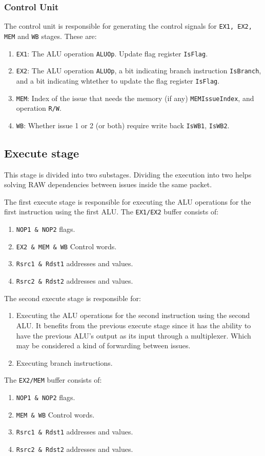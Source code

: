 \documentclass[12pt]{article}
\begin{document}
\subsubsection{Control Unit}
The control unit is responsible for generating the control signals for \texttt{EX1, EX2, MEM} and \texttt{WB} stages. These are:
\begin{enumerate}
\item \texttt{EX1}: The ALU operation \texttt{ALUOp}. Update flag register \texttt{IsFlag}.
\item \texttt{EX2}: The ALU operation \texttt{ALUOp}, a bit indicating branch instruction \texttt{IsBranch}, and a bit indicating whtether to update the flag register \texttt{IsFlag}.
\item \texttt{MEM}: Index of the issue that needs the memory (if any) \texttt{MEMIssueIndex}, and operation \texttt{R/W}.
\item \texttt{WB}: Whether issue 1 or 2 (or both) require write back \texttt{IsWB1}, \texttt{IsWB2}.
\end{enumerate}

\subsection{Execute stage}
This stage is divided into two substages. Dividing the execution into two helps solving RAW dependencies between issues inside the same packet.

\noindent The first execute stage is responsible for executing the ALU operations for the first instruction using the first ALU. 
The \texttt{EX1/EX2} buffer consists of:
\begin{enumerate}
	\item \texttt{NOP1 \& NOP2} flags.
	\item \texttt{EX2 \& MEM \& WB} Control words.  
	\item \texttt{Rsrc1 \& Rdst1} addresses and values.
	\item \texttt{Rsrc2 \& Rdst2} addresses and values.
\end{enumerate}

\noindent The second execute stage is responsible for:
\begin{enumerate}
\item Executing the ALU operations for the second instruction using the second ALU. It benefits from the previous execute stage since it has the ability to have the previous ALU's output as its input through a multiplexer. Which may be considered a kind of forwarding between issues.
\item Executing branch instructions.
\end{enumerate}
The \texttt{EX2/MEM} buffer consists of:
\begin{enumerate}
	\item \texttt{NOP1 \& NOP2} flags.
	\item \texttt{MEM \& WB} Control words.  
	\item \texttt{Rsrc1 \& Rdst1} addresses and values.
	\item \texttt{Rsrc2 \& Rdst2} addresses and values.
\end{enumerate}
\end{document}
